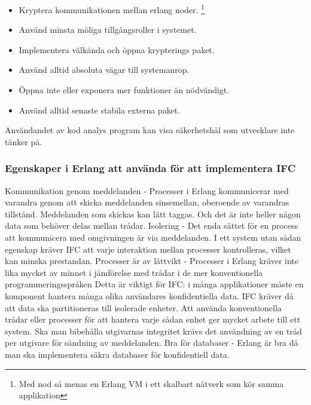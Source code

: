 \documentclass[12pt]{article}
\begin{document}
\begin{itemize} 
		\item Kryptera kommunikationen mellan erlang noder. \footnote{Med nod så menas en Erlang VM i ett skalbart nätverk som kör samma applikation}
		\item Använd minsta möliga tillgångsroller i systemet.
		\item Implementera välkända och öppna krypterings paket.
		\item Använd alltid absoluta vägar till systemanrop.
		\item Öppna inte eller exponera mer funktioner än nödvändigt.
		\item Använd alltid senaste stabila externa paket.
	\end{itemize}
Användandet av kod analys program kan visa säkerhetshål som utvecklare inte tänker på.

\subsubsection*{Egenskaper i Erlang att använda för att implementera IFC} 
Kommunikation genom meddelanden - Processer i Erlang kommunicerar med varandra genom att skicka meddelanden sinsemellan, oberoende av varandras tillstånd.
 Meddelanden som skickas kan lätt taggas.
 Och det är inte heller någon data som behöver delas mellan trådar.
Isolering - Det enda sättet för en process att kommunicera med omgivningen är via meddelanden.
 I ett system utan sådan egenskap kräver IFC att varje interaktion mellan processer kontrolleras, vilket kan minska prestandan.
 Processer är av lättvikt - Processer i Erlang kräver inte lika mycket av minnet i jämförelse med trådar i de mer konventionella programmeringsspråken Detta är viktigt för IFC: i många applikationer måste en komponent hantera många olika användares konfidentiella data.
 IFC kräver då att data ska partitioneras till isolerade enheter.
 Att använda konventionella trådar eller processer för att hantera varje sådan enhet ger mycket arbete till ett system.
 Ska man bibehålla utgivarnas integritet krävs det användning av en tråd per utgivare för sändning av meddelanden.
 \cite{IFC}
Bra för databaser - Erlang är bra då man ska implementera säkra databaser för konfidentiell data.
 \cite{database}
\end{document}
